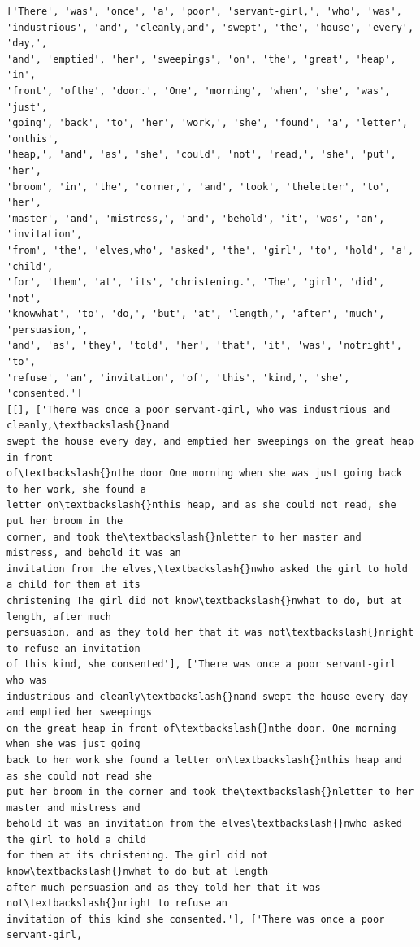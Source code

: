\documentclass[11pt]{article}
\begin{document}
    \begin{Verbatim}[commandchars=\\\{\}]
['There', 'was', 'once', 'a', 'poor', 'servant-girl,', 'who', 'was',
'industrious', 'and', 'cleanly,and', 'swept', 'the', 'house', 'every', 'day,',
'and', 'emptied', 'her', 'sweepings', 'on', 'the', 'great', 'heap', 'in',
'front', 'ofthe', 'door.', 'One', 'morning', 'when', 'she', 'was', 'just',
'going', 'back', 'to', 'her', 'work,', 'she', 'found', 'a', 'letter', 'onthis',
'heap,', 'and', 'as', 'she', 'could', 'not', 'read,', 'she', 'put', 'her',
'broom', 'in', 'the', 'corner,', 'and', 'took', 'theletter', 'to', 'her',
'master', 'and', 'mistress,', 'and', 'behold', 'it', 'was', 'an', 'invitation',
'from', 'the', 'elves,who', 'asked', 'the', 'girl', 'to', 'hold', 'a', 'child',
'for', 'them', 'at', 'its', 'christening.', 'The', 'girl', 'did', 'not',
'knowwhat', 'to', 'do,', 'but', 'at', 'length,', 'after', 'much', 'persuasion,',
'and', 'as', 'they', 'told', 'her', 'that', 'it', 'was', 'notright', 'to',
'refuse', 'an', 'invitation', 'of', 'this', 'kind,', 'she', 'consented.']
[[], ['There was once a poor servant-girl, who was industrious and cleanly,\textbackslash{}nand
swept the house every day, and emptied her sweepings on the great heap in front
of\textbackslash{}nthe door One morning when she was just going back to her work, she found a
letter on\textbackslash{}nthis heap, and as she could not read, she put her broom in the
corner, and took the\textbackslash{}nletter to her master and mistress, and behold it was an
invitation from the elves,\textbackslash{}nwho asked the girl to hold a child for them at its
christening The girl did not know\textbackslash{}nwhat to do, but at length, after much
persuasion, and as they told her that it was not\textbackslash{}nright to refuse an invitation
of this kind, she consented'], ['There was once a poor servant-girl who was
industrious and cleanly\textbackslash{}nand swept the house every day and emptied her sweepings
on the great heap in front of\textbackslash{}nthe door. One morning when she was just going
back to her work she found a letter on\textbackslash{}nthis heap and as she could not read she
put her broom in the corner and took the\textbackslash{}nletter to her master and mistress and
behold it was an invitation from the elves\textbackslash{}nwho asked the girl to hold a child
for them at its christening. The girl did not know\textbackslash{}nwhat to do but at length
after much persuasion and as they told her that it was not\textbackslash{}nright to refuse an
invitation of this kind she consented.'], ['There was once a poor servant-girl,

\end{Verbatim}
\end{document}
